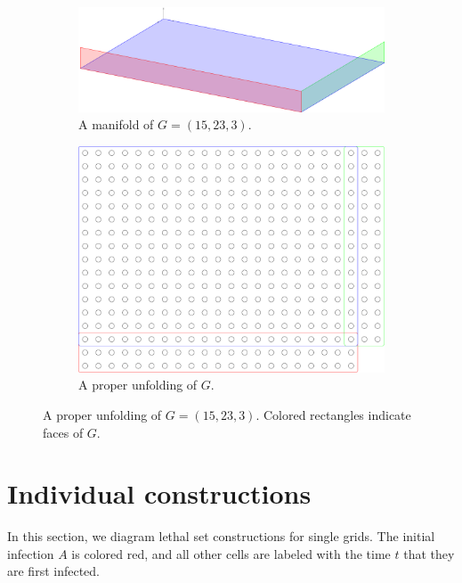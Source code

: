 \begin{figure}[]
\centering
\begin{subfigure}{0.45\textwidth}
	\includegraphics[width=\textwidth]{figures/7/17x25x1_manifold_3d.pdf}
	\caption{A manifold of $G= (15,23,3)$.}
	\label{}
\end{subfigure} \hfill%
\begin{subfigure}{0.45\textwidth}
	\includegraphics[width=\textwidth]{figures/7/17x25x1_manifold.pdf}
	\caption{A proper unfolding of $G$.}
	\label{}
\end{subfigure}
\caption{A proper unfolding of $G= (15,23,3)$. Colored rectangles indicate faces of $G$. }
\label{fig:17x25x1_manifold}
\end{figure} 

\section{Individual constructions}

In this section, we diagram lethal set constructions for single grids. The initial infection $A$ is colored red, and all other cells are labeled with the time $t$ that they are first infected. 

